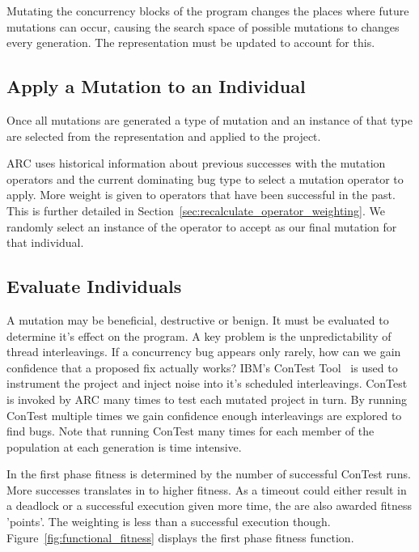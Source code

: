 \documentclass[10pt, conference, compsocconf]{IEEEtran}
\begin{document}
Mutating the concurrency blocks of the program changes the places where future
mutations can occur, causing the search space of possible mutations to changes
every generation. The representation must be updated to account for this.

\subsection{Apply a Mutation to an Individual}
\label{sec:mutate_individuals}

Once all mutations are generated a type of mutation and an instance of that
type are selected from the representation and applied to the project.

ARC uses historical information about previous successes with the mutation operators
and the current dominating bug type to select a mutation operator to apply. More 
weight is given to operators that have been successful in the past. This is further
detailed in Section~\ref{sec:recalculate_operator_weighting}. We randomly select an 
instance of the operator to accept as our final mutation for that individual. 

\subsection{Evaluate Individuals}
\label{sec:evalute_individuals}

A mutation may be beneficial, destructive or benign. It must be evaluated to
determine it's effect on the program. A key problem is the unpredictability of 
thread interleavings.  If a concurrency bug appears only rarely, how can we gain
confidence that a proposed fix actually works?  IBM's ConTest Tool~\cite{EFN+02} 
is used to instrument the project and inject noise into it's scheduled 
interleavings. ConTest is invoked by ARC many times to test each mutated project
in turn. By running ConTest multiple times we gain confidence enough interleavings
are explored to find bugs. Note that running ConTest many times for each member of
the population at each generation is time intensive.

In the first phase fitness is determined by the number of successful ConTest
runs. More successes translates in to higher fitness. As a timeout could either 
result in a deadlock or a successful execution given more time, the are also 
awarded fitness 'points'. The weighting is less than a successful execution
though. Figure~\ref{fig:functional_fitness} displays the first phase fitness 
function.
\end{document}
